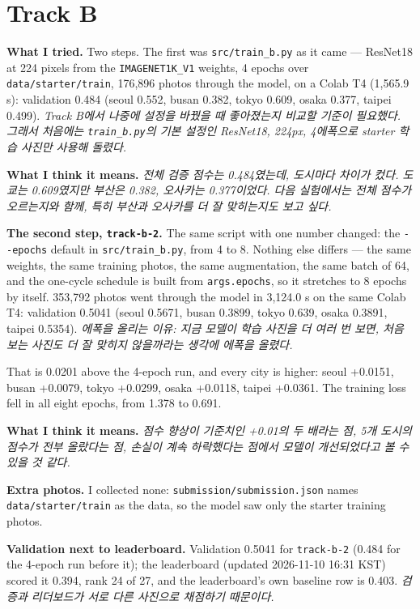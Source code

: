 \documentclass[11pt]{article}
\begin{document}
\section*{Track B}

\textbf{What I tried.} Two steps. The first was \texttt{src/train\_b.py} as it
came --- ResNet18 at 224 pixels from the \texttt{IMAGENET1K\_V1} weights, 4
epochs over \texttt{data/starter/train}, 176{,}896 photos through the model, on
a Colab T4 (1{,}565.9 s): validation 0.484 (seoul 0.552, busan 0.382, tokyo
0.609, osaka 0.377, taipei 0.499). \emph{Track B에서 나중에 설정을 바꿨을 때
좋아졌는지 비교할 기준이 필요했다. 그래서 처음에는 \texttt{train\_b.py}의 기본
설정인 ResNet18, 224px, 4에폭으로 starter 학습 사진만 사용해 돌렸다.}

\textbf{What I think it means.} \emph{전체 검증 점수는 0.484였는데, 도시마다
차이가 컸다. 도쿄는 0.609였지만 부산은 0.382, 오사카는 0.377이었다. 다음
실험에서는 전체 점수가 오르는지와 함께, 특히 부산과 오사카를 더 잘 맞히는지도
보고 싶다.}

\textbf{The second step, \texttt{track-b-2}.} The same script with one number
changed: the \texttt{-{}-epochs} default in \texttt{src/train\_b.py}, from 4 to
8. Nothing else differs --- the same weights, the same training photos, the same
augmentation, the same batch of 64, and the one-cycle schedule is built from
\texttt{args.epochs}, so it stretches to 8 epochs by itself. 353{,}792 photos
went through the model in 3{,}124.0 s on the same Colab T4: validation 0.5041
(seoul 0.5671, busan 0.3899, tokyo 0.639, osaka 0.3891, taipei 0.5354).
\emph{에폭을 올리는 이유: 지금 모델이 학습 사진을 더 여러 번 보면, 처음 보는
사진도 더 잘 맞히지 않을까라는 생각에 에폭을 올렸다.}

That is 0.0201 above the 4-epoch run, and every city is higher: seoul +0.0151,
busan +0.0079, tokyo +0.0299, osaka +0.0118, taipei +0.0361. The training loss
fell in all eight epochs, from 1.378 to 0.691.

\textbf{What I think it means.} \emph{점수 향상이 기준치인 +0.01의 두 배라는 점,
5개 도시의 점수가 전부 올랐다는 점, 손실이 계속 하락했다는 점에서 모델이
개선되었다고 볼 수 있을 것 같다.}

\textbf{Extra photos.} I collected none: \texttt{submission/submission.json}
names \texttt{data/starter/train} as the data, so the model saw only the starter
training photos.

\textbf{Validation next to leaderboard.} Validation 0.5041 for
\texttt{track-b-2} (0.484 for the 4-epoch run before it); the leaderboard (updated
2026-11-10 16:31 KST) scored it 0.394, rank 24 of 27, and the leaderboard's own
baseline row is 0.403. \emph{검증과 리더보드가 서로 다른 사진으로  채점하기 때문이다.}
\end{document}
